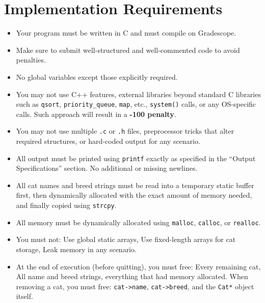 \documentclass[11pt]{article}
\begin{document}
\section*{Implementation Requirements}
\begin{itemize}
    \item Your program must be written in C and must compile on Gradescope.
    \item Make sure to submit well-structured and well-commented code to avoid penalties.
    \item No global variables except those explicitly required.
    \item You may not use C++ features, external libraries beyond standard C libraries such as \texttt{qsort}, \texttt{priority\_queue}, \texttt{map}, etc., \texttt{system()} calls, or any OS-specific calls. Such approach will result in a \textbf{-100 penalty}.
    \item You may not use multiple \texttt{.c} or \texttt{.h} files, preprocessor tricks that alter required structures, or hard-coded output for any scenario.
    \item All output must be printed using \texttt{printf} exactly as specified in the ``Output Specifications'' section. No additional or missing newlines.
    \item All cat names and breed strings must be read into a temporary static buffer first, then dynamically allocated with the exact amount of memory needed, and finally copied using \texttt{strcpy}.
    \item All memory must be dynamically allocated using \texttt{malloc}, \texttt{calloc}, or \texttt{realloc}.
    \item You must not: Use global static arrays, Use fixed-length arrays for cat storage, Leak memory in any scenario.
    \item At the end of execution (before quitting), you must free: Every remaining cat, All name and breed strings, everything that had memory allocated. When removing a cat, you must free: \texttt{cat->name}, \texttt{cat->breed}, and the \texttt{Cat*} object itself.
\end{itemize}
\end{document}
